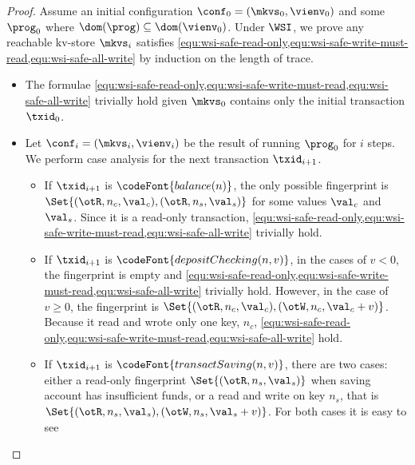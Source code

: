 \begin{proof}
    Assume an initial configuration \( \conf_0 = (\mkvs_0, \vienv_0 ) \) 
    and some \( \prog_0 \) where \( \dom(\prog) \subseteq \dom(\vienv_0) \).
    Under \( \WSI \), we prove any reachable kv-store \( \mkvs_i \) satisfies \cref{equ:wsi-safe-read-only,equ:wsi-safe-write-must-read,equ:wsi-safe-all-write} by induction on the length of trace.
    \begin{itemize}
        \item {} 
            The formulae \cref{equ:wsi-safe-read-only,equ:wsi-safe-write-must-read,equ:wsi-safe-all-write} trivially hold given \( \mkvs_0 \) contains only the initial transaction \( \txid_0 \).
        \item {}
            Let \( \conf_i = (\mkvs_i, \vienv_i)\) be the result of running \( \prog_0 \) for \( i \) steps.
            We perform case analysis for the next transaction \( \txid_{i+1} \).
            \begin{itemize}
                \item If \( \txid_{i+1} \) is \( \codeFont{balance(n)} \), 
                the only possible fingerprint is \( \Set{(\otR, n_c, \val_c), (\otR, n_s, \val_s)} \) 
                for some values \( \val_c \) and \( \val_s \).
                Since it is a read-only transaction, 
                \cref{equ:wsi-safe-read-only,equ:wsi-safe-write-must-read,equ:wsi-safe-all-write} trivially hold.
                \item If  \( \txid_{i+1} \) is \( \codeFont{depositChecking(n,v)} \), 
                in the cases of \( v < 0 \), the fingerprint is empty and 
                \cref{equ:wsi-safe-read-only,equ:wsi-safe-write-must-read,equ:wsi-safe-all-write} trivially hold.
                However, in the case of \( v \geq 0 \), the fingerprint is \( \Set{(\otR, n_c, \val_c), (\otW, n_c, \val_c + v)} \).
                Because it read and wrote only one key, \( n_c \),
                \cref{equ:wsi-safe-read-only,equ:wsi-safe-write-must-read,equ:wsi-safe-all-write} hold.
                \item If \( \txid_{i+1} \) is \( \codeFont{transactSaving(n,v)} \), 
                    there are two cases:
                    either a read-only fingerprint \( \Set{(\otR, n_s, \val_s)} \) 
                    when saving account has insufficient funds, or a read and write on key \( n_s \), 
                    that is \( \Set{(\otR, n_s, \val_s), (\otW, n_s, \val_s + v) }\).
                    For both cases it is easy to see 

\end{itemize}
\end{itemize}
\end{proof}
